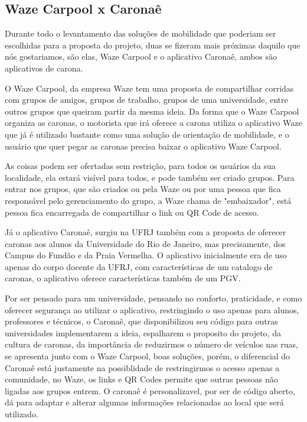 \subsection{Waze Carpool x Caronaê}
    Durante todo o levantamento das soluções de mobilidade que poderiam ser escolhidas para a proposta do projeto, duas se fizeram mais próximas daquilo que nós gostariamos, são elas, Waze Carpool e o aplicativo Caronaê, ambos são aplicativos de carona.
    
    O Waze Carpool, da empresa Waze tem uma proposta de compartilhar corridas com grupos de amigos, grupos de trabalho, grupos de uma universidade, entre outros grupos que queiram partir da mesma ideia. Da forma que o Waze Carpool organiza as caronas, o motorista que irá oferece a carona utiliza o aplicativo Waze que já é utilizado bastante como uma solução de orientação de mobilidade, e o usuário que quer pegar as caronas precisa baixar o aplicativo Waze Carpool.
    
    As coisas podem ser ofertadas sem restrição, para todos os usuários da sua localidade, ela estará visível para todos, e pode também ser criado grupos. Para entrar nos grupos, que são criados ou pela Waze ou por uma pessoa que fica responsável pelo gerenciamento do grupo, a Waze chama de "embaixador", está pessoa fica encarregada de compartilhar o link ou QR Code de acesso. 
    
    Já o aplicativo Caronaê, surgiu na UFRJ também com a proposta de oferecer caronas aos alunos da Universidade do Rio de Janeiro, mas precisamente, dos Campus do Fundão e da Praia Vermelha. O aplicativo inicialmente era de uso apenas do corpo docente da UFRJ, com características de um catalogo de caronas, o aplicativo oferece características também de um PGV. 
    
    Por ser pensado para um universidade, pensando no conforto, praticidade, e como oferecer segurança ao utilizar o aplicativo, restringindo o uso apenas para alunos, professores e técnicos, o Caronaê, que disponibilizou seu código para outras universidades implementarem a ideia, espalharem o proposito do projeto, da cultura de caronas, da importância de reduzirmos o número de veículos nas ruas, se apresenta junto com o Waze Carpool, boas soluções, porém, o diferencial do Caronaê está justamente na possiblidade de restringirmos o acesso apenas a comunidade, no Waze, os links e QR Codes permite que outras pessoas não ligadas aos grupos entrem. O caronaê é personalizavel, por ser de código aberto, dá para adaptar e alterar algumas informações relacionadas ao local que será utilizado. 

